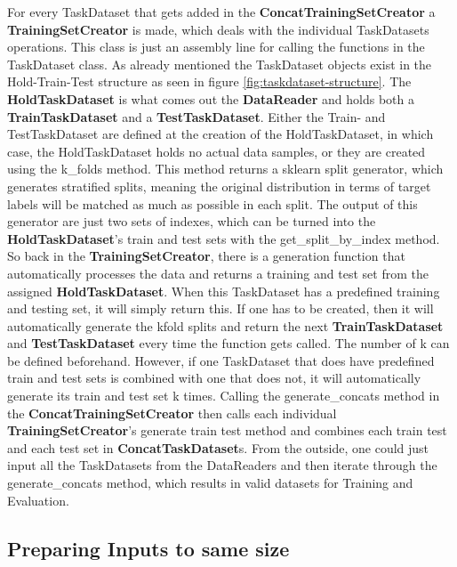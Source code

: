 For every TaskDataset that gets added in the \textbf{ConcatTrainingSetCreator} a \textbf{TrainingSetCreator} is made, which deals with the individual TaskDatasets operations. This class is just an assembly line for calling the functions in the TaskDataset class. As already mentioned the TaskDataset objects exist in the Hold-Train-Test structure as seen in figure \ref{fig:taskdataset-structure}. The \textbf{HoldTaskDataset} is what comes out the \textbf{DataReader} and holds both a \textbf{TrainTaskDataset} and a \textbf{TestTaskDataset}. Either the Train- and TestTaskDataset are defined at the creation of the HoldTaskDataset, in which case, the HoldTaskDataset holds no actual data samples, or they are created using the k\_folds method. This method returns a sklearn split generator, which generates stratified splits, meaning the original distribution in terms of target labels will be matched as much as possible in each split. The output of this generator are just two sets of indexes, which can be turned into the \textbf{HoldTaskDataset}'s train and test sets with the get\_split\_by\_index method. \\

So back in the \textbf{TrainingSetCreator}, there is a generation function that automatically processes the data and returns a training and test set from the assigned \textbf{HoldTaskDataset}. When this TaskDataset has a predefined training and testing set, it will simply return this. If one has to be created, then it will automatically generate the kfold splits and return the next \textbf{TrainTaskDataset} and \textbf{TestTaskDataset} every time the function gets called. The number of k can be defined beforehand. However, if one TaskDataset that does have predefined train and test sets is combined with one that does not, 
it will automatically generate its train and test set k times. Calling the generate\_concats method in the \textbf{ConcatTrainingSetCreator} then calls each individual \textbf{TrainingSetCreator}'s generate train test method and combines each train test and each test set in \textbf{ConcatTaskDataset}s. From the outside, one could just input all the TaskDatasets from the DataReaders and then iterate through the generate\_concats method, which results in valid datasets for Training and Evaluation. \\

\subsection{Preparing Inputs to same size} \label{Impl:DataLoad:Prep}

